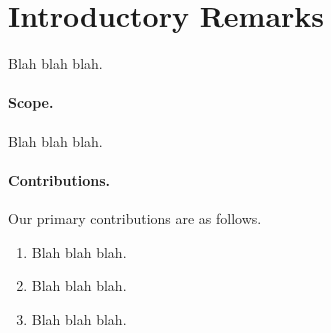 
\section{Introductory Remarks}

Blah blah blah.

 

\paragraph{Scope.} 
Blah blah blah.


\paragraph{Contributions.} 
Our primary contributions are as follows.

\begin{enumerate}

\item Blah blah blah.

\item Blah blah blah. 

\item Blah blah blah. 

\end{enumerate}

